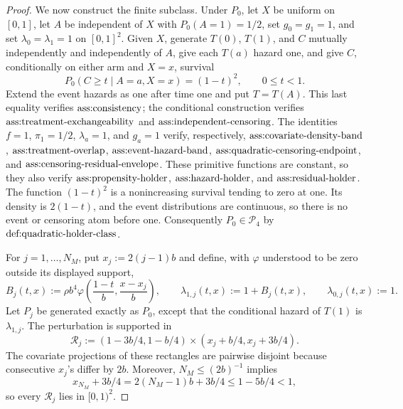 \documentclass{article}
\begin{document}
\begin{proof}
We now construct the finite subclass.  Under \(P_0\), let \(X\) be uniform on \([0,1]\), let \(A\) be independent of \(X\) with \(P_0(A=1)=1/2\), set \(g_0=g_1=1\), and set \(\lambda_0=\lambda_1=1\) on \([0,1]^2\).  Given \(X\), generate \(T(0)\), \(T(1)\), and \(C\) mutually independently and independently of \(A\), give each \(T(a)\) hazard one, and give \(C\), conditionally on either arm and \(X=x\), survival
\[
 P_0(C\ge t\mid A=a,X=x)=(1-t)^2,
 \qquad 0\le t<1.
\]
Extend the event hazards as one after time one and put \(T=T(A)\).  This last equality verifies \(\textnormal{ass:consistency}\); the conditional construction verifies \(\textnormal{ass:treatment-exchangeability}\) and \(\textnormal{ass:independent-censoring}\).  The identities \(f=1\), \(\pi_1=1/2\), \(\lambda_a=1\), and \(g_a=1\) verify, respectively, \(\textnormal{ass:covariate-density-band}\), \(\textnormal{ass:treatment-overlap}\), \(\textnormal{ass:event-hazard-band}\), \(\textnormal{ass:quadratic-censoring-endpoint}\), and \(\textnormal{ass:censoring-residual-envelope}\).  These primitive functions are constant, so they also verify \(\textnormal{ass:propensity-holder}\), \(\textnormal{ass:hazard-holder}\), and \(\textnormal{ass:residual-holder}\).  The function \((1-t)^2\) is a nonincreasing survival tending to zero at one.  Its density is \(2(1-t)\), and the event distributions are continuous, so there is no event or censoring atom before one.  Consequently \(P_0\in\mathcal P_4\) by \(\textnormal{def:quadratic-holder-class}\).

For \(j=1,\ldots,N_M\), put \(x_j:=2(j-1)b\) and define, with \(\varphi\) understood to be zero outside its displayed support,
\[
 B_j(t,x):=\rho b^4
 \varphi\!\left(\frac{1-t}{b},\frac{x-x_j}{b}\right),
 \qquad
 \lambda_{1,j}(t,x):=1+B_j(t,x),
 \qquad
 \lambda_{0,j}(t,x):=1.                                  \tag{4}
\]
Let \(P_j\) be generated exactly as \(P_0\), except that the conditional hazard of \(T(1)\) is \(\lambda_{1,j}\).  The perturbation is supported in
\[
 \mathcal R_j:=
 (1-3b/4,1-b/4)\times(x_j+b/4,x_j+3b/4).                  \tag{5}
\]
The covariate projections of these rectangles are pairwise disjoint because consecutive \(x_j\)'s differ by \(2b\).  Moreover, \(N_M\le(2b)^{-1}\) implies
\[
 x_{N_M}+3b/4=2(N_M-1)b+3b/4\le1-5b/4<1,
\]
so every \(\mathcal R_j\) lies in \([0,1)^2\).


\end{proof}
\end{document}
